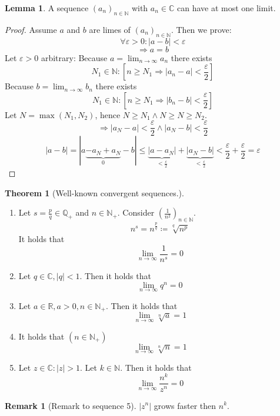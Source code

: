 \documentclass[a4paper,landscape,twocolumn]{article}
\theoremstyle{definition}
\newtheorem{theorem}{Theorem}
\newtheorem{rem}{Remark}
\newtheorem{lemma}{Lemma}
\newcommand\abs[1]{\left|#1\right|}
\begin{document}
\begin{lemma}
  A sequence $(a_n)_{n \in \mathbb N}$ with $a_n \in \mathbb C$ can have at most one limit.
\end{lemma}
\begin{proof}
  Assume $a$ and $b$ are limes of $(a_n)_{n \in \mathbb N}$. Then we prove:
  \[ \forall \varepsilon > 0: \abs{a - b} < \varepsilon \]
  \[ \Rightarrow a = b \]
  Let $\varepsilon > 0$ arbitrary:
  Because $a = \lim_{n \to \infty} a_n$ there exists
  \[ N_1 \in \mathbb N: \left[n \geq N_1 \Rightarrow \abs{a_n - a} < \frac{\varepsilon}2\right] \]
  Because $b = \lim_{n \to \infty} b_n$ there exists
  \[ N_1 \in \mathbb N: \left[n \geq N_1 \Rightarrow \abs{b_n - b} < \frac{\varepsilon}2\right] \]
  Let $N = \max(N_1, N_2)$, hence $N \geq N_1 \land N \geq N \geq N_2$.
  \[ \Rightarrow \abs{a_N - a} < \frac{\varepsilon}{2} \land \abs{a_N - b} < \frac{\varepsilon}{2} \]
  \[ \abs{a - b} = |a \underbrace{- a_N + a_N}_0 - b| \leq \underbrace{\abs{a - a_N}}_{< \frac{\varepsilon}2} + \underbrace{\abs{a_N - b}}_{< \frac{\varepsilon}2} < \frac{\varepsilon}{2} + \frac{\varepsilon}{2} = \varepsilon \]
\end{proof}

\begin{theorem}[Well-known convergent sequences.] \hfill{}
  \begin{enumerate}
    \item
      Let $s = \frac pq \in \mathbb Q_+$ and $n \in \mathbb N_+$. Consider $\left(\frac 1{n^2}\right)_{n \in \mathbb N}$.
      \[ n^s = n^{\frac pq} \coloneqq \sqrt[q]{n^p} \]
      It holds that
      \[ \lim_{n \to \infty} \frac{1}{n^s} = 0 \]
    \item Let $q \in \mathbb C, \abs{q} < 1$. Then it holds that
      \[ \lim_{n \to \infty} q^n = 0 \]
    \item Let $a \in \mathbb R, a > 0, n \in \mathbb N_+$. Then it holds that
      \[ \lim_{n \to \infty} \sqrt[n]{a} = 1 \]
    \item It holds that $(n \in \mathbb N_+)$
      \[ \lim_{n \to \infty} \sqrt[n]{n} = 1 \]
    \item Let $z \in \mathbb C: \abs{z} > 1$. Let $k \in \mathbb N$.
      Then it holds that \[ \lim_{n \to \infty} \frac{n^k}{z^n} = 0 \]
  \end{enumerate}
\end{theorem}

\begin{rem}[Remark to sequence 5]
  $\abs{z^n}$ grows faster then $n^k$.
\end{rem}
\end{document}
